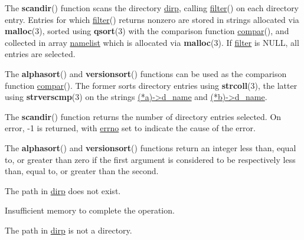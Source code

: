 \documentclass[]{article}
\let\realtextbf=\textbf
\renewcommand{\textbf}[1]{\textcolor{boldcolor}{\realtextbf{#1}}}
\renewcommand{\emph}[1]{\underline{#1}}
\begin{document}
The \textbf{scandir}() function scans the directory \emph{dirp}, calling
\emph{filter}() on each directory entry. Entries for which
\emph{filter}() returns nonzero are stored in strings allocated via
\textbf{malloc}(3), sorted using \textbf{qsort}(3) with the comparison
function \emph{compar}(), and collected in array \emph{namelist} which
is allocated via \textbf{malloc}(3). If \emph{filter} is NULL, all
entries are selected.

The \textbf{alphasort}() and \textbf{versionsort}() functions can be
used as the comparison function \emph{compar}(). The former sorts
directory entries using \textbf{strcoll}(3), the latter using
\textbf{strverscmp}(3) on the strings \emph{(*a)-\textgreater{}d\_name}
and \emph{(*b)-\textgreater{}d\_name}.


The \textbf{scandir}() function returns the number of directory entries
selected. On error, -1 is returned, with \emph{errno} set to indicate
the cause of the error.

The \textbf{alphasort}() and \textbf{versionsort}() functions return an
integer less than, equal to, or greater than zero if the first argument
is considered to be respectively less than, equal to, or greater than
the second.


\begin{description}
\itemsep1pt\parskip0pt
\item[\textbf{ENOENT}]
The path in \emph{dirp} does not exist.
\end{description}

\begin{description}
\itemsep1pt\parskip0pt
\item[\textbf{ENOMEM}]
Insufficient memory to complete the operation.
\end{description}

\begin{description}
\itemsep1pt\parskip0pt
\item[\textbf{ENOTDIR}]
The path in \emph{dirp} is not a directory.
\end{description}
\end{document}
